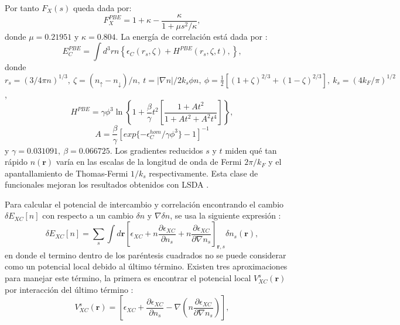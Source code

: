    Por tanto  $F_X (s)$ queda dada por:
   \begin{equation}
   F_{X}^{PBE} = 1+\kappa -\frac{\kappa}{1+\mu s^2 /\kappa}, \label{ec:F_X-PBE}
   \end{equation}
   donde $\mu = 0.21951 $ y $\kappa= 0.804 $. La energ\'ia de correlaci\'on est\'a dada por \cite{mo_2004}:
   \begin{equation}
   E_{C} ^{PBE} = \int d^3 r n \left\{\epsilon_{C}(r_s,\zeta)+ H^{PBE} (r_s,\zeta,t), \right\}\label{ec:funcCorr},
   \end{equation}
   donde $r_s = (3/4 \pi n)^{1/3}, ~ \zeta =(n_{\uparrow}-n_{\downarrow})/n,~ t=|\nabla n|/2 k_s \phi n, ~\phi= \frac{1}{2} [(1+\zeta)^{2/3}+(1-\zeta)^{2/3}],~ k_s = (4 k_F/\pi)^{1/2}$,
   \begin{equation}
   H^{PBE} = \gamma \phi^3 \ln \left\{1+ \frac{\beta}{\gamma} t^2 \left[\frac{1+At^2}{1+At^2+A^2 t^4}\right]\right\}, \label{ec:PBEH}
   \end{equation}
   \begin{equation}
   A=\frac{\beta}{\gamma} [exp\{-\epsilon_{C}^{hom}/\gamma \phi^3 \}-1]^{-1} \label{ec:A}
   \end{equation}
   y $\gamma=0.031091, ~\beta=0.066725$. Los gradientes reducidos $s$ y $t$ miden qu\'e tan r\'apido $n(\pmb{r})$ var\'ia en las escalas de la longitud de onda de Fermi $2\pi/k_F$ y el apantallamiento de Thomas-Fermi $1/k_s$ respectivamente. Esta clase de funcionales mejoran los resultados obtenidos con LSDA \cite{MB-2015}.
   \newline
   \par Para calcular el potencial de intercambio y correlaci\'on encontrando el cambio $\delta E_{XC} [n]$ con respecto a un cambio  $\delta n$ y $\nabla \delta n$, se usa la siguiente expresi\'on \cite{Martin-2004}:
   \begin{equation}
   \delta E_{XC} [n] = \sum_{s} \int d \pmb{r} \left[\epsilon_{XC} + n \frac{\partial \epsilon_{XC}}{\partial n_s} + n \frac{\partial \epsilon_{XC}}{\partial \nabla n_s} \right]_{\pmb{r},s} \delta n_s(\pmb{r}), \label{ec:ecpotVXC_1}
   \end{equation}
   en donde el termino dentro de los par\'entesis cuadrados no se puede considerar como un potencial local debido al \'ultimo t\'ermino. Existen tres aproximaciones para manejar este t\'ermino, la primera es encontrar el potencial local $V_{XC}^s (\pmb{r})$ por interacci\'on  del \'ultimo  t\'ermino \cite{Martin-2004}:
   \begin{equation}
   V_{XC}^s (\pmb{r}) = \left[\epsilon_{XC}+\frac{\partial \epsilon_{XC}}{\partial n_s}- \nabla \left(n \frac{\partial \epsilon_{XC}}{\partial \nabla n_s}\right) \right] \label{ec:potXC_2},
   \end{equation}
